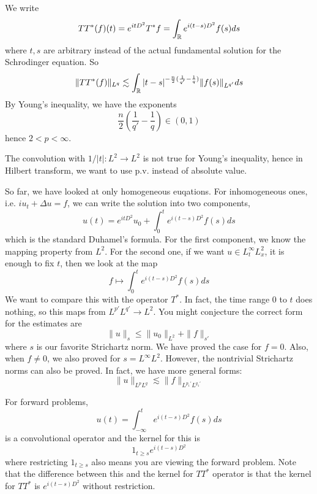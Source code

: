 We write
\begin{equation*}
    TT^*(f)(t)=e^{itD^2}T^*f=\int_{\mathbb{R}} e^{i(t-s)D^2}f(s)ds
\end{equation*}
where $t,s$ are arbitrary instead of the actual fundamental solution for the Schrodinger equation. So 
\begin{equation*}
    \|TT^*(f)\|_{L^q}\lesssim\int_{\mathbb{R}}|t-s|^{-\frac{n}{2}(\frac{1}{q'}-\frac{1}{q})}\|f(s)\|_{L^{q'}}ds
\end{equation*}
By Young's inequality, we have the exponents
\begin{equation*}
    \frac{n}{2}\left(\frac{1}{q'}-\frac{1}{q} \right)\in (0,1)
\end{equation*}
hence $2<p<\infty$. 

\begin{remark}
    The convolution with $1/|t|: L^2\to L^2$ is not true for Young's inequality, hence in Hilbert transform, we want to use p.v. instead of absolute value.
\end{remark}

So far, we have looked at only homogeneous euqations. For inhomogeneous ones, i.e. $iu_t+\Delta u=f$, we can write the solution into two components,
\begin{equation*}
    u(t)=e^{itD^2}u_0+\int_0^te^{i(t-s)D^2}f(s)ds
\end{equation*}
which is the standard Duhamel's formula. For the first component, we know the mapping property from $L^2$. For the second one, if we want $u\in L_t^\infty L_x^2$, it is enough to fix $t$, then we look at the map
\begin{equation*}
    f\mapsto \int_0^te^{i(t-s)D^2}f(s)ds
\end{equation*}
We want to compare this with the operator $T^*$. In fact, the time range 0 to $t$ does nothing, so this maps from $L^{p'}L^{q'}\to L^2$. You might conjecture the correct form for the estimates are
\begin{equation*}
    \|u\|_s\leq\|u_0\|_{L^2}+\|f\|_{s'}
\end{equation*}
where $s$ is our favorite Strichartz norm. We have proved the case for $f=0$. Also, when $f\neq 0$, we also proved for $s=L^\infty L^2$. However, the nontrivial Strichartz norms can also be proved. In fact, we have more general forms:
\begin{equation*}
    \|u\|_{L^pL^q}\lesssim \|f\|_{L^{p_1'}L^{q_1'}}
\end{equation*}

For forward problems,
\begin{equation*}
    u(t)=\int_{-\infty}^t e^{i(t-s)D^2}f(s)ds
\end{equation*}
is a convolutional operator and the kernel for this is 
\begin{equation*}
    1_{t\geq s}e^{i(t-s)D^2}
\end{equation*}
where restricting $1_{t\geq s}$ also means you are viewing the forward problem. Note that the difference between this and the kernel for $TT^*$  operator is that the kernel for $TT^*$ is $e^{i(t-s)D^2}$ without restriction.

